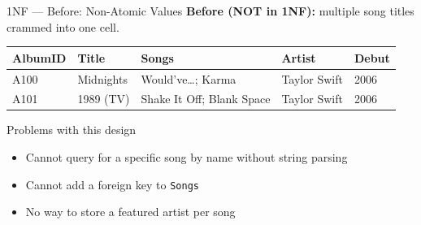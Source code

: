 \begin{frame}{1NF --- Before: Non-Atomic Values}
  \textbf{Before (NOT in 1NF):} multiple song titles crammed into one cell.

  \vspace{6pt}
  \begin{center}
  \small
  \begin{tabular}{lllll}
    \toprule
    \textbf{AlbumID} & \textbf{Title} & \textbf{Songs} & \textbf{Artist} & \textbf{Debut} \\
    \midrule
    A100 & Midnights & Would've\ldots; Karma & Taylor Swift & 2006 \\
    A101 & 1989 (TV) & Shake It Off; Blank Space & Taylor Swift & 2006 \\
    \bottomrule
  \end{tabular}
  \end{center}

  \vspace{6pt}
  \begin{alertblock}{Problems with this design}
    \begin{itemize}
      \item Cannot query for a specific song by name without string parsing
      \item Cannot add a foreign key to \texttt{Songs}
      \item No way to store a featured artist per song
    \end{itemize}
  \end{alertblock}
\end{frame}

